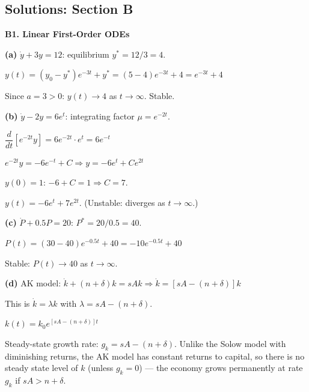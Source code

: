 \documentclass[12pt, a4paper]{article}
\theoremstyle{definition}
\begin{document}
\subsection{Solutions: Section B}

\begin{solbox}
\textbf{B1. Linear First-Order ODEs}

\textbf{(a)} $\dot y+3y=12$: equilibrium $y^*=12/3=4$.

$y(t)=(y_0-y^*)e^{-3t}+y^*=(5-4)e^{-3t}+4 = e^{-3t}+4$

Since $a=3>0$: $y(t)\to 4$ as $t\to\infty$. Stable.

\textbf{(b)} $\dot y-2y=6e^t$: integrating factor $\mu=e^{-2t}$.

$\dfrac{d}{dt}[e^{-2t}y]=6e^{-2t}\cdot e^t=6e^{-t}$

$e^{-2t}y = -6e^{-t}+C \Rightarrow y = -6e^t + Ce^{2t}$

$y(0)=1$: $-6+C=1 \Rightarrow C=7$.

$y(t)=-6e^t+7e^{2t}$. (Unstable: diverges as $t\to\infty$.)

\textbf{(c)} $\dot P+0.5P=20$: $P^*=20/0.5=40$.

$P(t)=(30-40)e^{-0.5t}+40=-10e^{-0.5t}+40$

Stable: $P(t)\to 40$ as $t\to\infty$.

\textbf{(d)} AK model: $\dot k+(n+\delta)k=sAk \Rightarrow \dot k=[sA-(n+\delta)]k$

This is $\dot k=\lambda k$ with $\lambda=sA-(n+\delta)$.

$k(t)=k_0 e^{[sA-(n+\delta)]t}$

Steady-state growth rate: $g_k = sA-(n+\delta)$. Unlike the Solow model
with diminishing returns, the AK model has constant returns to capital, so
there is no steady state level of $k$ (unless $g_k=0$) --- the economy
grows permanently at rate $g_k$ if $sA>n+\delta$.
\end{solbox}
\end{document}
